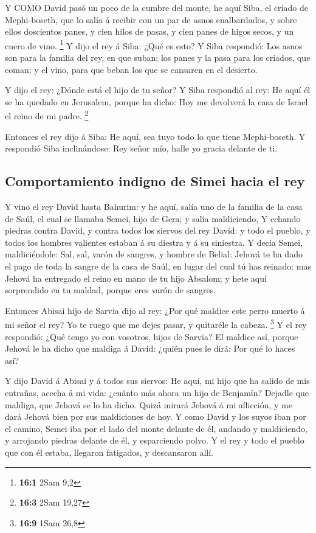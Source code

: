  Y COMO David pasó un poco de la cumbre del monte, he aquí
Siba, el criado de Mephi-boseth, que lo salía á recibir con un par de
asnos enalbardados, y sobre ellos doscientos panes, y cien hilos de
pasas, y cien panes de higos secos, y un cuero de vino. \footnote{\textbf{16:1}
  2Sam 9,2}  Y dijo el rey á Siba: ¿Qué es esto? Y Siba
respondió: Los asnos son para la familia del rey, en que suban; los
panes y la pasa para los criados, que coman; y el vino, para que beban
los que se cansaren en el desierto.

 Y dijo el rey: ¿Dónde está el hijo de tu señor? Y Siba
respondió al rey: He aquí él se ha quedado en Jerusalem, porque ha
dicho: Hoy me devolverá la casa de Israel el reino de mi padre.
\footnote{\textbf{16:3} 2Sam 19,27}

 Entonces el rey dijo á Siba: He aquí, sea tuyo todo lo que
tiene Mephi-boseth. Y respondió Siba inclinándose: Rey señor mío, halle
yo gracia delante de ti.

\hypertarget{comportamiento-indigno-de-simei-hacia-el-rey}{%
\subsection{Comportamiento indigno de Simei hacia el
rey}\label{comportamiento-indigno-de-simei-hacia-el-rey}}

 Y vino el rey David hasta Bahurim: y he aquí, salía uno de
la familia de la casa de Saúl, el cual se llamaba Semei, hijo de Gera; y
salía maldiciendo,  Y echando piedras contra David, y contra
todos los siervos del rey David: y todo el pueblo, y todos los hombres
valientes estaban á su diestra y á su siniestra.  Y decía
Semei, maldiciéndole: Sal, sal, varón de sangres, y hombre de Belial:
 Jehová te ha dado el pago de toda la sangre de la casa de
Saúl, en lugar del cual tú has reinado: mas Jehová ha entregado el reino
en mano de tu hijo Absalom; y hete aquí sorprendido en tu maldad, porque
eres varón de sangres.

 Entonces Abisai hijo de Sarvia dijo al rey: ¿Por qué
maldice este perro muerto á mi señor el rey? Yo te ruego que me dejes
pasar, y quitaréle la cabeza. \footnote{\textbf{16:9} 1Sam 26,8}
 Y el rey respondió: ¿Qué tengo yo con vosotros, hijos de
Sarvia? El maldice así, porque Jehová le ha dicho que maldiga á David:
¿quién pues le dirá: Por qué lo haces así?

 Y dijo David á Abisai y á todos sus siervos: He aquí, mi
hijo que ha salido de mis entrañas, acecha á mi vida: ¿cuánto más ahora
un hijo de Benjamín? Dejadle que maldiga, que Jehová se lo ha dicho.
 Quizá mirará Jehová á mi aflicción, y me dará Jehová bien
por sus maldiciones de hoy.  Y como David y los suyos iban
por el camino, Semei iba por el lado del monte delante de él, andando y
maldiciendo, y arrojando piedras delante de él, y esparciendo polvo.
 Y el rey y todo el pueblo que con él estaba, llegaron
fatigados, y descansaron allí.

